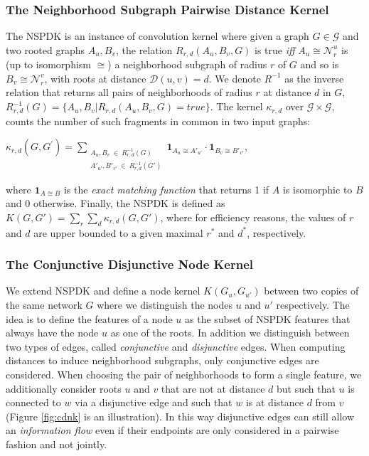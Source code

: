\subsubsection{The Neighborhood Subgraph Pairwise Distance Kernel}
\label{sec:k}
The NSPDK is an instance of convolution kernel \cite{haussler1999convolution} where given a graph $G \in \mathcal{G}$ and two rooted graphs $A_u, B_v$, the relation $R_{r,d}(A_u, B_v, G)$ is true {\em iff} $A_u \cong \mathcal{N}_r^u$ is (up to isomorphism $\cong$) a neighborhood subgraph of radius $r$ of $G$ and so is $B_v \cong  \mathcal{N}_r^v$, with roots at distance $\mathcal{D}(u,v)= d$. We denote $R^{-1}$ as the inverse relation that returns all pairs of neighborhoods of radius $r$ at distance $d$ in $G$, $R^{-1}_{r,d}(G) = \lbrace A_u, B_v | R_{r,d}(A_u,B_v,G)=true\rbrace$. The kernel $\kappa_{r,d}$ over $\mathcal{G} \times \mathcal{G}$, counts the number of such fragments in common in two input graphs: 
\begin{center}
$\kappa_{r,d}(G,G^{'}) = 
\!\!\!\!\!\!\!\!\!\!\!\! 
\sum\limits_{\substack{A_u, B_v \ \in \ R_{r,d}^{-1}(G) \\ 
{A'}_{u'}, {B'}_{v'} \ \in \ R_{r,d}^{-1}(G')
}} \!\!\!\!\!\!\!\!\!\!\!\!  { { \textbf{1}_{A_{u} \cong A'_{u'}}} \cdot {
\textbf{1}_{B_{v} \cong B'_{v'}}} }$, 
\end{center} 
\noindent where $\textbf{1}_{A \cong B}$ is the \textit{exact matching function} that returns 1 if $A$ is
isomorphic to $B$ and 0 otherwise.  Finally, the NSPDK is defined as $K(G,G') = \sum\limits_{r}{\sum\limits_{d}{\kappa_{r,d}(G,G')}}$, where for efficiency reasons, the values of $r$ and $d$ are upper bounded to a given maximal $r^*$ and $d^*$, respectively.

\subsubsection{The Conjunctive Disjunctive Node Kernel}
We extend NSPDK and define a node kernel $K(G_u,G_{u'})$ between two copies of the same network $G$ where we distinguish the nodes $u$ and $u'$ respectively. The idea is to define the features of a node $u$ as the subset of NSPDK features that always have the node $u$ as one of the roots. In addition we distinguish between two types of edges, called {\em conjunctive} and {\em disjunctive} edges. When computing distances to induce neighborhood subgraphs, only conjunctive edges are considered. When choosing the
pair of neighborhoods to form a single feature, we additionally consider roots $u$ and $v$ that are not at distance $d$ but such that $u$ is connected to $w$ via a disjunctive edge and such that $w$ is at distance $d$ from $v$ (Figure \ref{fig:cdnk} is an illustration). In this way disjunctive edges can still allow an {\em information flow} even if their
endpoints are only considered in a pairwise fashion and not jointly. 

